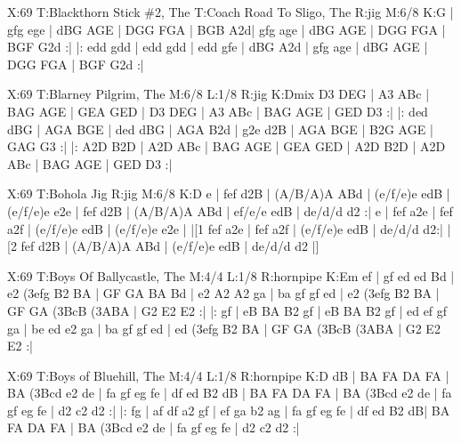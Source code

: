 \documentclass{article}
\begin{document}
\begin{abc}[name]
X:69
T:Blackthorn Stick \#2, The
T:Coach Road To Sligo, The
R:jig
M:6/8
K:G
| gfg ege | dBG AGE | DGG FGA | BGB A2d|
gfg age | dBG AGE | DGG FGA | BGF G2d :|
|: edd gdd | edd gdd | edd gfe | dBG A2d |
gfg age | dBG AGE | DGG FGA | BGF G2d :|
\end{abc}

\begin{abc}[name]
X:69
T:Blarney Pilgrim, The
M:6/8
L:1/8
R:jig
K:Dmix
D3 DEG | A3 ABc | BAG AGE | GEA GED |
D3 DEG | A3 ABc | BAG AGE | GED D3 :|
|: ded dBG | AGA BGE | ded dBG | AGA B2d |
g2e d2B | AGA BGE | B2G AGE | GAG G3 :|
|: A2D B2D | A2D ABc | BAG AGE | GEA GED |
A2D B2D | A2D ABc | BAG AGE | GED D3 :|
\end{abc}

\begin{abc}[name]
X:69
T:Bohola Jig
R:jig
M:6/8
K:D
e | fef d2B | (A/B/A)A ABd | (e/f/e)e edB | (e/f/e)e e2e |
fef d2B | (A/B/A)A ABd | ef/e/e edB | de/d/d d2 :|
e | fef a2e | fef a2f | (e/f/e)e edB | (e/f/e)e e2e |
|[1 fef a2e | fef a2f | (e/f/e)e edB | de/d/d d2:|
|[2 fef d2B | (A/B/A)A ABd | (e/f/e)e edB | de/d/d d2 |]
\end{abc}

\begin{abc}[name]
X:69
T:Boys Of Ballycastle, The
M:4/4
L:1/8
R:hornpipe
K:Em
ef | gf ed ed Bd | e2 (3efg B2 BA | GF GA BA Bd | e2 A2 A2 ga |
ba gf gf ed | e2 (3efg B2 BA | GF GA (3BcB (3ABA | G2 E2 E2 :|
|: gf | eB BA B2 gf | eB BA B2 gf | ed ef gf ga | be ed e2 ga  |
ba gf gf ed | ed (3efg B2 BA | GF GA (3BcB (3ABA | G2 E2 E2 :|
\end{abc}

\begin{abc}[name]
X:69
T:Boys of Bluehill, The
M:4/4
L:1/8
R:hornpipe
K:D
dB | BA FA DA FA | BA (3Bcd e2 de | fa gf eg fe | df ed B2 dB |
BA FA DA FA | BA (3Bcd e2 de | fa gf eg fe | d2 c2 d2 :|
|: fg | af df a2 gf | ef ga b2 ag | fa gf eg fe | df ed B2 dB|
BA FA DA FA | BA (3Bcd e2 de | fa gf eg fe | d2 c2 d2 :|
\end{abc}
\end{document}
